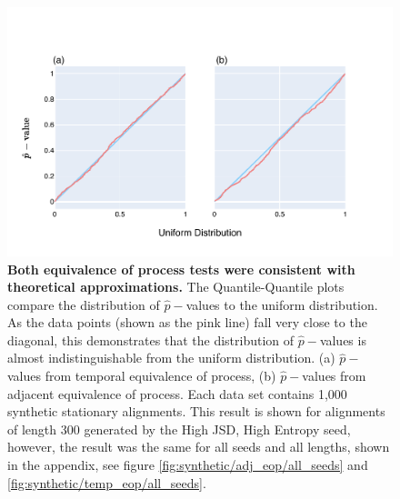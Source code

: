 \begin{figure}[htbp]
\centering
\includegraphics[width=\textwidth]{figures/plots/synthetic/adj-temp_eop/High JSD, High Entropy.pdf}
\caption{\textbf{Both equivalence of process tests were consistent with theoretical approximations.} The Quantile-Quantile plots compare the distribution of $\hat p-$values to the uniform distribution. As the data points (shown as the pink line) fall very close to the diagonal, this demonstrates that the distribution of $\hat p-$values is almost indistinguishable from the uniform distribution. (a) $\hat p-$values from temporal equivalence of process, (b) $\hat p-$values from adjacent equivalence of process. Each data set contains 1,000 synthetic stationary alignments. This result is shown for alignments of length 300 generated by the High JSD, High Entropy seed, however, the result was the same for all seeds and all lengths, shown in the appendix, see figure \ref{fig:synthetic/adj_eop/all_seeds} and \ref{fig:synthetic/temp_eop/all_seeds}.}
\label{fig:synthetic/adj-temp_eop/HighJSDHighEntropy}
\end{figure}